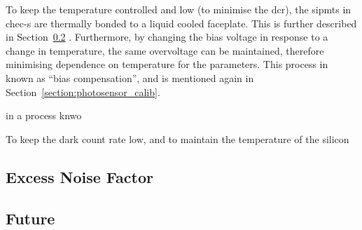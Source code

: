 To keep the temperature controlled and low (to minimise the \gls{dcr}), the \glspl{sipmt} in \gls{chec-s} are thermally bonded to a liquid cooled faceplate. This is further described in Section~\ref{} . Furthermore, by changing the bias voltage in response to a change in temperature, the same overvoltage can be maintained, therefore minimising dependence on temperature for the parameters. This process in known as ``bias compensation'', and is mentioned again in Section~\ref{section:photosensor_calib}.


in a process knwo

To keep the dark count rate low, and to maintain the temperature of the silicon









\subsection{Excess Noise Factor} \label{section:enf}

\subsection{Future}



